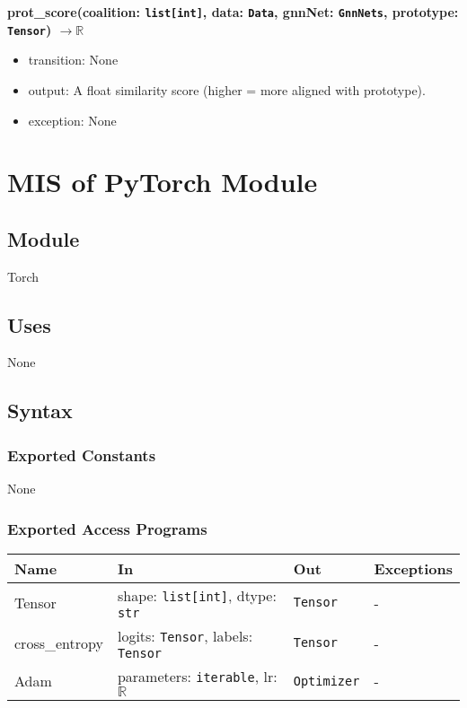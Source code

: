 \documentclass[12pt, titlepage]{article}
\begin{document}
\noindent 
\textbf{prot\_score(coalition: \texttt{list[int]}, data: \texttt{Data}, gnnNet: \texttt{GnnNets}, prototype: \texttt{Tensor}) \(\rightarrow \mathbb{R}\)}
\begin{itemize}
  \item transition: None
  \item output: A float similarity score (higher = more aligned with prototype).
  \item exception: None
\end{itemize}




\section{MIS of PyTorch Module} \label{TorchModule}

\subsection{Module}
Torch

\subsection{Uses}
None

\subsection{Syntax}

\subsubsection{Exported Constants}
None

\subsubsection{Exported Access Programs}

\begin{center}
\begin{tabular}{p{3.2cm} p{5.5cm} p{4cm} p{2.5cm}}
\hline
\textbf{Name} & \textbf{In} & \textbf{Out} & \textbf{Exceptions} \\
\hline
Tensor & shape: \texttt{list[int]}, dtype: \texttt{str} & \texttt{Tensor} & - \\
cross\_entropy & logits: \texttt{Tensor}, labels: \texttt{Tensor} & \texttt{Tensor} & - \\
Adam & parameters: \texttt{iterable}, lr: \(\mathbb{R}\) & \texttt{Optimizer} & - \\
\hline
\end{tabular}
\end{center}
\end{document}
